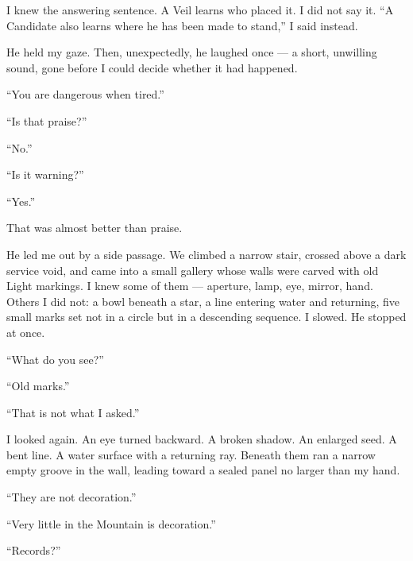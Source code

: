 I knew the answering sentence. A Veil learns who placed it. I did not say it. ``A Candidate also learns where he has been made to stand,'' I said instead.\par

He held my gaze. Then, unexpectedly, he laughed once --- a short, unwilling sound, gone before I could decide whether it had happened.\par

``You are dangerous when tired.''\par

``Is that praise?''\par

``No.''\par

``Is it warning?''\par

``Yes.''\par

That was almost better than praise.\par

\ornament

He led me out by a side passage. We climbed a narrow stair, crossed above a dark service void, and came into a small gallery whose walls were carved with old Light markings. I knew some of them --- aperture, lamp, eye, mirror, hand. Others I did not: a bowl beneath a star, a line entering water and returning, five small marks set not in a circle but in a descending sequence. I slowed. He stopped at once.\par

``What do you see?''\par

``Old marks.''\par

``That is not what I asked.''\par

I looked again. An eye turned backward. A broken shadow. An enlarged seed. A bent line. A water surface with a returning ray. Beneath them ran a narrow empty groove in the wall, leading toward a sealed panel no larger than my hand.\par

``They are not decoration.''\par

``Very little in the Mountain is decoration.''\par

``Records?''\par


